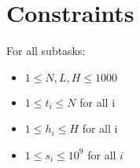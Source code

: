 \section*{Constraints}

For all subtasks:
\begin{itemize}
    \item $1\leq N, L, H \leq 1000$
    \item $1 \leq t_i \leq N$ for all i
    \item $1 \leq h_i \leq H$ for all i
    \item $1 \leq s_i \leq 10^9$ for all $i$
\end{itemize}